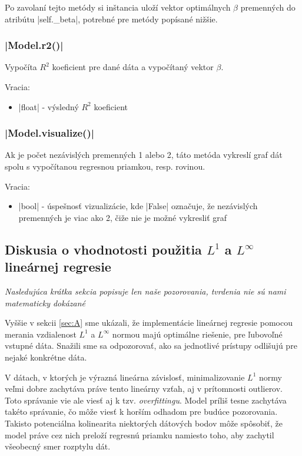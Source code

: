 \documentclass[report.tex]{subfiles}
\begin{document}
Po zavolaní tejto metódy si inštancia uloží vektor optimálnych $\beta$ premenných do atribútu \pyth|self._beta|, potrebné pre metódy popísané nižšie.

\subsubsection*{\pyth|Model.r2()|}

Vypočíta $R^2$ koeficient pre dané dáta a vypočítaný vektor $\beta$.

Vracia:

\begin{itemize}
	\item \pyth|float| - výsledný $R^2$ koeficient
\end{itemize}

\subsubsection*{\pyth|Model.visualize()|}

Ak je počet nezávislých premenných 1 alebo 2, táto metóda vykreslí graf dát spolu s vypočítanou regresnou priamkou, resp. rovinou. 

Vracia:

\begin{itemize}
	\item \pyth|bool| - úspešnosť vizualizácie, kde \pyth|False| označuje, že nezávislých premenných je viac ako 2, čiže nie je možné vykresliť graf
\end{itemize}

\subsection{Diskusia o vhodnotosti použitia $L^1$ a $L^{\infty}$ lineárnej regresie}

\textit{Nasledujúca krátka sekcia popisuje len naše pozorovania, tvrdenia nie sú nami matematicky dokázané}

Vyššie v sekcii \ref{sec:A} sme ukázali, že implementácie lineárnej regresie pomocou merania vzdialenost $L^1$ a $L^{\infty}$ normou majú optimálne riešenie, pre ľubovoľné vstupné dáta. Snažili sme sa odpozorovať, ako sa jednotlivé prístupy odlišujú pre nejaké konkrétne dáta.

V dátach, v ktorých je výrazná lineárna závislosť, minimalizovanie $L^1$ normy veľmi dobre zachytáva práve tento lineárny vzťah, aj v prítomnosti outlierov. Toto správanie vie ale viesť aj k tzv. \textit{overfittingu}. Model príliš tesne zachytáva takéto správanie, čo môže viesť k horším odhadom pre budúce pozorovania. Takisto potenciálna kolinearita niektorých dátových bodov môže spôsobiť, že model práve cez nich preloží regresnú priamku namiesto toho, aby zachytil všeobecný smer rozptylu dát.
\end{document}
